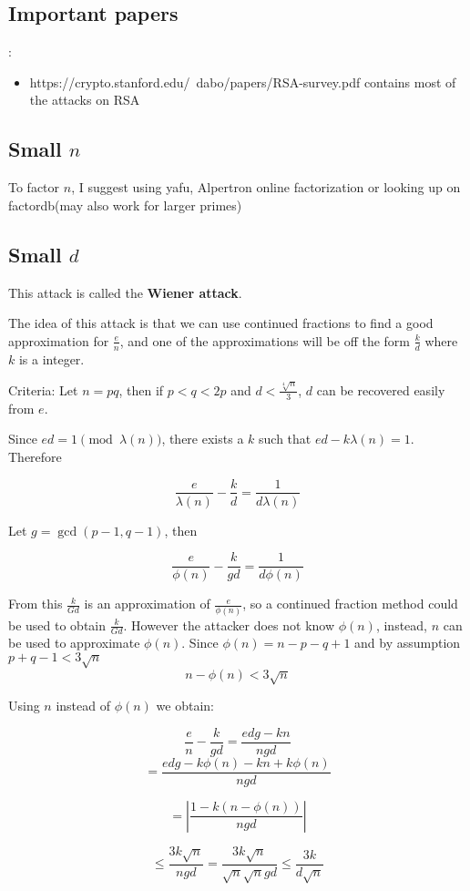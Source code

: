 \documentclass{report}
\begin{document}
\subsection{Important papers}:

\begin{itemize}
	\item https://crypto.stanford.edu/~dabo/papers/RSA-survey.pdf contains most of the attacks on RSA
\end{itemize}

\subsection{Small $n$}
To factor $n$, I suggest using yafu, Alpertron online factorization or looking up on factordb(may also work for larger primes)
\subsection{Small $d$}
This attack is called the \textbf{Wiener attack}.

The idea of this attack is that we can use continued fractions to find a good approximation for $\frac{e}{n}$, and one of the approximations will be off the form $\frac{k}{d}$ where $k$ is a integer.

Criteria: Let $n=pq$, then if $p<q<2p$ and $d<\frac{\sqrt[4]{n}}{3}$, $d$ can be recovered easily from $e$.

Since $ed = 1\pmod{\lambda(n)}$, there exists a $k$ such that $ed-k\lambda(n)=1$. Therefore


$$\frac{e}{\lambda(n)}-\frac{k}{d}=\frac{1}{d \lambda(n)}$$

Let $g=\gcd(p-1,q-1)$, then

$$\frac{e}{\phi(n)}-\frac{k}{gd}=\frac{1}{d\phi(n)}$$ 

From this $\frac{k}{Gd}$ is an approximation of $\frac{e}{\phi(n)}$, so a continued fraction method could be used to obtain $\frac{k}{Gd}$. However the attacker does not know $\phi(n)$, instead, $n$ can be used to approximate $\phi(n)$. Since
$\phi(n)=n-p-q+1$ and by assumption $p+q-1<3\sqrt{n}$
$$n-\phi(n)<3\sqrt{n}$$

Using $n$ instead of $\phi(n)$ we obtain:


$$\frac{e}{n}-\frac{k}{gd}=\frac{edg-kn}{ngd}$$
$$=\frac{edg-k\phi(n)-kn+k\phi(n)}{ngd}$$

$$= \left \vert \frac{1-k(n-\phi(n))}{ngd} \right \vert $$

$$\le\frac{3k\sqrt{n}}{ngd}=\frac{3k\sqrt{n}}{\sqrt{n}\sqrt{n}gd} \le\frac{3k}{d\sqrt{n}}$$
\end{document}
